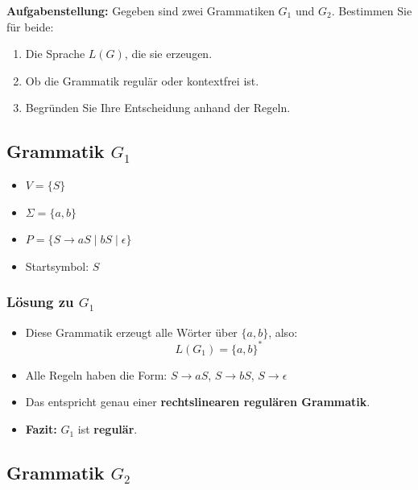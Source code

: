 \documentclass[a4paper,12pt]{article}
\begin{document}
\begin{enumerate}
			\textbf{Aufgabenstellung:}  
			Gegeben sind zwei Grammatiken \( G_1 \) und \( G_2 \). Bestimmen Sie für beide:
			\begin{enumerate}
				\item Die Sprache \( L(G) \), die sie erzeugen.
				\item Ob die Grammatik regulär oder kontextfrei ist.
				\item Begründen Sie Ihre Entscheidung anhand der Regeln.
			\end{enumerate}
			
			\vspace{1em}
			
			\subsection*{Grammatik \( G_1 \)}
			
			\begin{itemize}
				\item \( V = \{S\} \)
				\item \( \Sigma = \{a, b\} \)
				\item \( P = \{S \rightarrow aS \mid bS \mid \epsilon\} \)
				\item Startsymbol: \( S \)
			\end{itemize}
			
			\subsubsection*{Lösung zu \( G_1 \)}
			
			\begin{itemize}
				\item Diese Grammatik erzeugt alle Wörter über \( \{a, b\} \), also:
				\[
				L(G_1) = \{a, b\}^*
				\]
				\item Alle Regeln haben die Form: \( S \rightarrow aS \), \( S \rightarrow bS \), \( S \rightarrow \epsilon \)
				\item Das entspricht genau einer \textbf{rechtslinearen regulären Grammatik}.
				\item \textbf{Fazit:} \( G_1 \) ist \textbf{regulär}.
			\end{itemize}
			
			\vspace{1em}
			
			\subsection*{Grammatik \( G_2 \)}
			

\end{enumerate}
\end{document}
